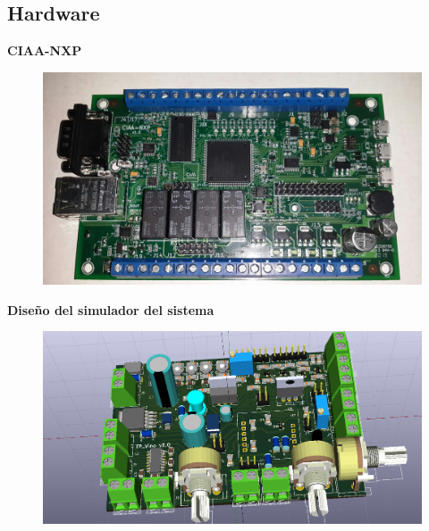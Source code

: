 \documentclass[11pt]{beamer}
\begin{document}
\subsection{Hardware}
\begin{frame}{\textbf{\LARGE{CIAA-NXP}}}
  \vspace{-.7cm}
  \begin{figure}[H]
    {\includegraphics[width=1\textwidth]{./imagenes/ciaa.png}}
  \end{figure}	
\end{frame}

\begin{frame}{\textbf{\LARGE{Diseño del simulador del sistema}}}
  \vspace{-.7cm}
  \begin{figure}[H]
    {\includegraphics[width=1\textwidth]{./imagenes/pcb_3d.png}}
  \end{figure}	
\end{frame}
\end{document}
